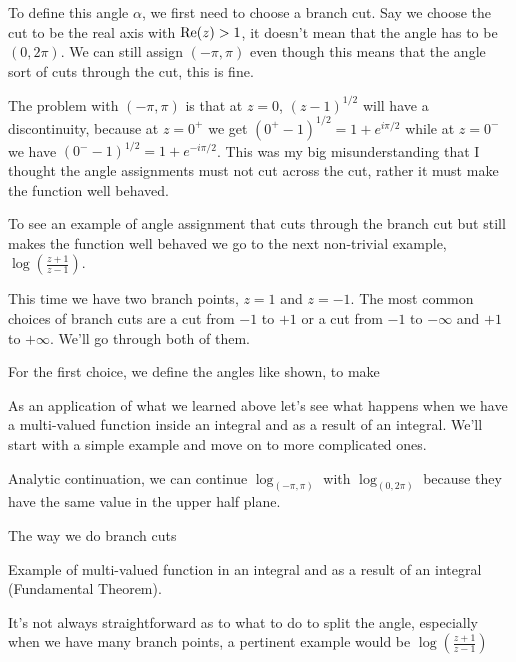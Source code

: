 \documentclass[aps,preprint,preprintnumbers,nofootinbib,showpacs,prd]{revtex4-1}
\newcommand{\re}{{\rm Re}}
\begin{document}
To define this angle $\alpha$, we first need to choose a branch cut. Say we choose the cut to be the real axis with $\re(z) > 1$, it doesn't mean that the angle has to be $(0,2\pi)$. We can still assign $(-\pi,\pi)$ even though this means that the angle sort of cuts through the cut, this is fine.

The problem with $(-\pi, \pi)$ is that at $z = 0$, $(z-1)^{1/2}$ will have a discontinuity, because at $z = 0^+$ we get $(0^+-1)^{1/2} = 1 + e^{i\pi/2}$ while at $z = 0^-$ we have $(0^--1)^{1/2} = 1 + e^{-i\pi/2}$. This was my big misunderstanding that I thought the angle assignments must not cut across the cut, rather it must make the function well behaved.

To see an example of angle assignment that cuts through the branch cut but still makes the function well behaved we go to the next non-trivial example, $\log \left ( \frac{z+1}{z-1}\right )$.

This time we have two branch points, $z = 1$ and $z = -1$. The most common choices of branch cuts are a cut from $-1$ to $+1$ or a cut from $-1$ to $-\infty$ and $+1$ to $+\infty$. We'll go through both of them.

For the first choice, we define the angles like shown, to make

 


As an application of what we learned above let's see what happens when we have a multi-valued function inside an integral and as a result of an integral. We'll start with a simple example and move on to more complicated ones.





Analytic continuation, we can continue $\log_{(-\pi,\pi)}$ with $\log_{(0,2\pi)}$ because they have the same value in the upper half plane.






The way we do branch cuts



Example of multi-valued function in an integral and as a result of an integral (Fundamental Theorem).

It's not always straightforward as to what to do to split the angle, especially when we have many branch points, a pertinent example would be $\log\left ( \tfrac{z+1}{z-1}\right )$
\end{document}
